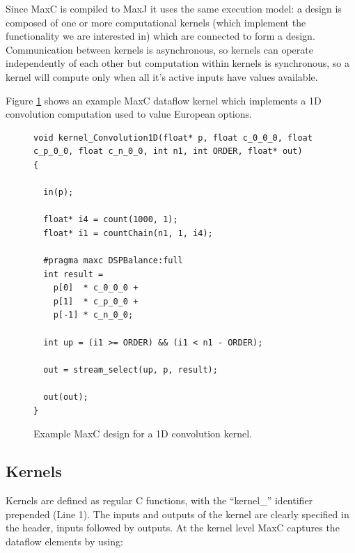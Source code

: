 Since MaxC is compiled to MaxJ it uses the same execution model: a
design is composed of one or more computational kernels (which
implement the functionality we are interested in) which are connected
to form a design. Communication between kernels is asynchronous, so
kernels can operate independently of each other but computation within
kernels is synchronous, so a kernel will compute only when all it's
active inputs have values available.

Figure \ref{fig:maxc-1dconv} shows an example MaxC dataflow kernel
which implements a 1D convolution computation used to value European
options.


\lstset{style=MaxC}

\begin{figure}
\begin{lstlisting}
void kernel_Convolution1D(float* p, float c_0_0_0, float c_p_0_0, float c_n_0_0, int n1, int ORDER, float* out)
{

  in(p);

  float* i4 = count(1000, 1);
  float* i1 = countChain(n1, 1, i4);

  #pragma maxc DSPBalance:full
  int result =
    p[0]  * c_0_0_0 +
    p[1]  * c_p_0_0 +
    p[-1] * c_n_0_0;

  int up = (i1 >= ORDER) && (i1 < n1 - ORDER);

  out = stream_select(up, p, result);

  out(out);
}
\end{lstlisting}
\caption{Example MaxC design for a 1D convolution kernel.}
\label{fig:maxc-1dconv}
\end{figure}

\subsection{Kernels}

Kernels are defined as regular C functions, with the ``kernel\_''
identifier prepended (Line 1). The inputs and outputs of the kernel
are clearly specified in the header, inputs followed by outputs. At
the kernel level MaxC captures the dataflow elements by using:

